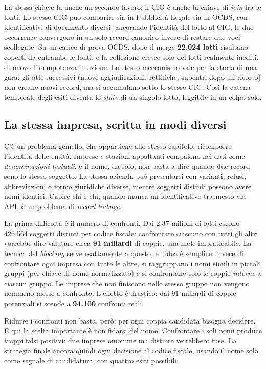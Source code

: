 \documentclass[11pt,a4paper]{article}
\begin{document}
La stessa chiave fa anche un secondo lavoro: il CIG è anche la chiave
di \emph{join} fra le fonti. Lo stesso CIG può comparire sia in Pubblicità Legale sia in OCDS,
con identificativi di documento diversi; ancorando l'identità del lotto al CIG, le due
occorrenze convergono in un solo record canonico invece di restare due voci scollegate. Su un
carico di prova OCDS, dopo il merge \textbf{22.024 lotti} risultano coperti da entrambe le
fonti, e la collezione cresce solo dei lotti realmente inediti, di nuovo l'idempotenza in
azione. Lo stesso meccanismo vale per la storia di una gara: gli atti successivi (nuove
aggiudicazioni, rettifiche, subentri dopo un ricorso) non creano nuovi record, ma si accumulano
sotto lo stesso CIG. Così la catena temporale degli esiti diventa lo \emph{stato} di un singolo
lotto, leggibile in un colpo solo.

\subsection{La stessa impresa, scritta in modi diversi}

C'è un problema gemello, che appartiene allo stesso capitolo: ricomporre l'identità delle
entità. Imprese e stazioni appaltanti compaiono nei dati come \emph{denominazioni testuali}, e
il nome, da solo, non basta a dire quando due record sono lo stesso soggetto. La stessa azienda
può presentarsi con varianti, refusi, abbreviazioni o forme giuridiche diverse, mentre soggetti
distinti possono avere nomi identici. Capire chi è chi, quando manca un identificativo
trasmesso via API, è un problema di \emph{record linkage}.

La prima difficoltà è il numero di confronti. Dai 2,37 milioni di lotti escono 426.564 soggetti
distinti per codice fiscale: confrontare ciascuno con tutti gli altri vorrebbe dire valutare
circa \textbf{91 miliardi} di coppie, una mole impraticabile. La tecnica del \emph{blocking}
serve esattamente a questo, e l'idea è semplice: invece di confrontare ogni impresa con tutte
le altre, si raggruppano i nomi simili in piccoli gruppi (per chiave di nome normalizzato) e si
confrontano solo le coppie \emph{interne} a ciascun gruppo. Le imprese che non finiscono nello
stesso gruppo non vengono nemmeno messe a confronto. L'effetto è drastico: dai 91 miliardi di
coppie potenziali si scende a \textbf{94.100} confronti reali.

Ridurre i confronti non basta, però: per ogni coppia candidata bisogna decidere. E qui la
scelta importante è non fidarsi del nome. Confrontare i soli nomi produce troppi falsi
positivi: due imprese omonime ma distinte verrebbero fuse. La strategia finale àncora quindi
ogni decisione al codice fiscale, usando il nome solo come segnale di candidatura, con quattro
esiti possibili:
\end{document}
